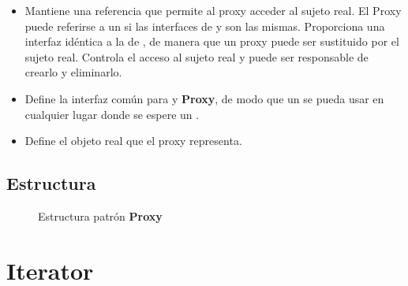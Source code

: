 \begin{itemize}
\item \Proxy Mantiene una referencia que permite al proxy acceder al sujeto real. El Proxy puede referirse a un \Sujuteo si las interfaces de \SujetoRea y \Sujeto son las mismas.
Proporciona una interfaz idéntica a la de \Sujeto, de manera que un proxy puede ser sustituido por el sujeto real.
Controla el acceso al sujeto real y puede ser responsable de crearlo y eliminarlo.

\item \Sujeto Define la interfaz común para \SujetoReal y \textbf{Proxy}, de modo que un \Proxy se pueda usar en cualquier lugar donde se espere un \SujetoReal.

\item \RealSubject Define el objeto real que el proxy representa.

\end{itemize}


\subsection*{Estructura}


\begin{figure}[H]
\caption{Estructura patrón \textbf{Proxy}}
\begin{center}
\end{center}
\end{figure}




\section{Iterator}
\label{patronIterator}


